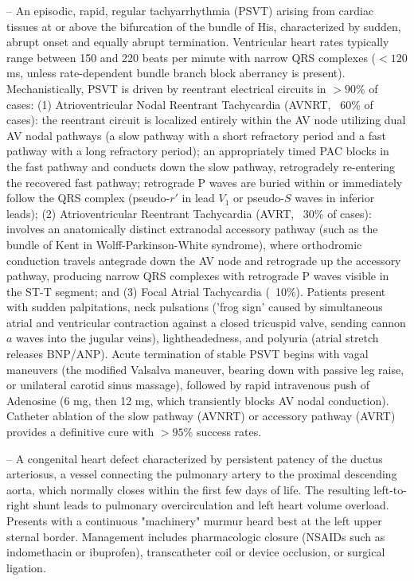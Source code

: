 -- An episodic, rapid, regular tachyarrhythmia (PSVT) arising from cardiac tissues at or above the bifurcation of the bundle of His, characterized by sudden, abrupt onset and equally abrupt termination. Ventricular heart rates typically range between 150 and 220 beats per minute with narrow QRS complexes ($<120$ ms, unless rate-dependent bundle branch block aberrancy is present). Mechanistically, PSVT is driven by reentrant electrical circuits in $>90\%$ of cases: (1) Atrioventricular Nodal Reentrant Tachycardia (AVNRT, ~60\% of cases): the reentrant circuit is localized entirely within the AV node utilizing dual AV nodal pathways (a slow pathway with a short refractory period and a fast pathway with a long refractory period); an appropriately timed PAC blocks in the fast pathway and conducts down the slow pathway, retrogradely re-entering the recovered fast pathway; retrograde P waves are buried within or immediately follow the QRS complex (pseudo-$r'$ in lead $V_1$ or pseudo-$S$ waves in inferior leads); (2) Atrioventricular Reentrant Tachycardia (AVRT, ~30\% of cases): involves an anatomically distinct extranodal accessory pathway (such as the bundle of Kent in Wolff-Parkinson-White syndrome), where orthodromic conduction travels antegrade down the AV node and retrograde up the accessory pathway, producing narrow QRS complexes with retrograde P waves visible in the ST-T segment; and (3) Focal Atrial Tachycardia (~10\%). Patients present with sudden palpitations, neck pulsations ('frog sign' caused by simultaneous atrial and ventricular contraction against a closed tricuspid valve, sending cannon $a$ waves into the jugular veins), lightheadedness, and polyuria (atrial stretch releases BNP/ANP). Acute termination of stable PSVT begins with vagal maneuvers (the modified Valsalva maneuver, bearing down with passive leg raise, or unilateral carotid sinus massage), followed by rapid intravenous push of Adenosine (6 mg, then 12 mg, which transiently blocks AV nodal conduction). Catheter ablation of the slow pathway (AVNRT) or accessory pathway (AVRT) provides a definitive cure with $>95\%$ success rates.

-- A congenital heart defect characterized by persistent patency of the ductus arteriosus, a vessel connecting the pulmonary artery to the proximal descending aorta, which normally closes within the first few days of life. The resulting left-to-right shunt leads to pulmonary overcirculation and left heart volume overload. Presents with a continuous "machinery" murmur heard best at the left upper sternal border. Management includes pharmacologic closure (NSAIDs such as indomethacin or ibuprofen), transcatheter coil or device occlusion, or surgical ligation.

